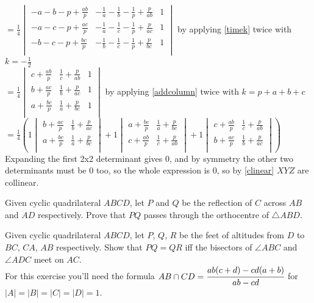 \documentclass[11pt]{scrartcl}
\begin{document}
\begin{soln}
  $
  =
  \frac{1}{4}\begin{vmatrix} 
  -a-b-p+\frac{ab}{p} & -\frac{1}{a}-\frac{1}{b}-\frac{1}{p}+\frac{p}{ab} & 1 \\
  -a-c-p+\frac{ac}{p} & -\frac{1}{a}-\frac{1}{c}-\frac{1}{p}+\frac{p}{ac} & 1 \\
  -b-c-p+\frac{bc}{p} & -\frac{1}{b}-\frac{1}{c}-\frac{1}{p}+\frac{p}{bc} & 1 \\
  \end{vmatrix}
  $ by applying \ref{timek} twice with $k=-\frac{1}{2}$\\
  $
  =
  \frac{1}{4}\begin{vmatrix} 
  c+\frac{ab}{p} & \frac{1}{c}+\frac{p}{ab} & 1 \\
  b+\frac{ac}{p} & \frac{1}{b}+\frac{p}{ac} & 1 \\
  a+\frac{bc}{p} & \frac{1}{a}+\frac{p}{bc} & 1 \\
  \end{vmatrix}
  $ by applying \ref{addcolumn} twice with $k=p+a+b+c$\\
  $
  =
  \frac{1}{4}(
  1\begin{vmatrix}
  b+\frac{ac}{p} & \frac{1}{b}+\frac{p}{ac} \\
  a+\frac{bc}{p} & \frac{1}{a}+\frac{p}{bc} \\
  \end{vmatrix}  
  +1\begin{vmatrix}
  a+\frac{bc}{p} & \frac{1}{a}+\frac{p}{bc} \\
  c+\frac{ab}{p} & \frac{1}{c}+\frac{p}{ab} \\
  \end{vmatrix}
  +1\begin{vmatrix}
  c+\frac{ab}{p} & \frac{1}{c}+\frac{p}{ab} \\
  b+\frac{ac}{p} & \frac{1}{b}+\frac{p}{ac} \\
  \end{vmatrix}  
  )
  $\\
  Expanding the first 2x2 determinant gives 0, and by symmetry the other two determinants must be 0 too, so the whole expression is 0, so by \ref{clinear} $XYZ$ are collinear.
\end{soln}
\begin{exercise}
  Given cyclic quadrilateral $ABCD$, let $P$ and $Q$ be the reflection of $C$ across $AB$ and $AD$ respectively. Prove that $PQ$ passes through the orthocentre of $\triangle ABD$. 
\end{exercise}
\begin{exercise} [IMO2003/4]
  Given cyclic quadrilateral $ABCD$, let $P$, $Q$, $R$ be the feet of altitudes from $D$ to $BC$, $CA$, $AB$ respectively. Show that $PQ=QR$ iff the bisectors of $\angle ABC$ and $\angle ADC$ meet on $AC$. \\
  For this exercise you'll need the formula $AB\cap CD = \cfrac{ab(c+d)-cd(a+b)}{ab-cd}$ for $|A|=|B|=|C|=|D|=1$.
\end{exercise}
\end{document}
